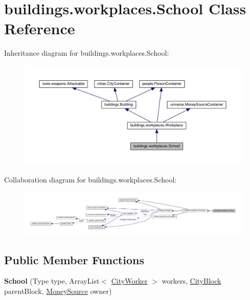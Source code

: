\hypertarget{classbuildings_1_1workplaces_1_1_school}{}\section{buildings.\+workplaces.\+School Class Reference}
\label{classbuildings_1_1workplaces_1_1_school}


Inheritance diagram for buildings.\+workplaces.\+School\+:\nopagebreak
\begin{figure}[H]
\begin{center}
\leavevmode
\includegraphics[width=350pt]{classbuildings_1_1workplaces_1_1_school__inherit__graph}
\end{center}
\end{figure}


Collaboration diagram for buildings.\+workplaces.\+School\+:\nopagebreak
\begin{figure}[H]
\begin{center}
\leavevmode
\includegraphics[width=350pt]{classbuildings_1_1workplaces_1_1_school__coll__graph}
\end{center}
\end{figure}
\subsection*{Public Member Functions}
\begin{DoxyCompactItemize}
\item 
{\bfseries School} (Type type, Array\+List$<$ \hyperlink{classpeople_1_1cityworkers_1_1_city_worker}{City\+Worker} $>$ workers, \hyperlink{classcities_1_1_city_block}{City\+Block} parent\+Block, \hyperlink{classuniverse_1_1_money_source}{Money\+Source} owner)\hypertarget{classbuildings_1_1workplaces_1_1_school_a2b3adb4d311533688c30ccf17caa8ba5}{}\label{classbuildings_1_1workplaces_1_1_school_a2b3adb4d311533688c30ccf17caa8ba5}

\end{DoxyCompactItemize}
